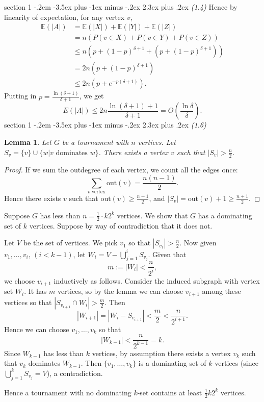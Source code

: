 \documentclass[12pt]{article}
\makeatletter
\theoremstyle{norm}
\newtheorem{lem}[thm]{Lemma}
\newcommand{\E}[0]{\mathbb{E}}
\newcommand{\rc}[1]{\frac{1}{#1}}
\newcommand{\de}[0]{\delta}
\newcommand{\ab}[1]{\left| {#1} \right|}
\newcommand{\pa}[1]{\left( {#1} \right)}
\newcommand{\pf}[2]{\pa{\frac{#1}{#2}}}
\newenvironment{problem}{\@startsection
       {section}
       {1}
       {-.2em}
       {-3.5ex plus -1ex minus -.2ex}
       {2.3ex plus .2ex}
       {\pagebreak[3]%
       \large\bf\noindent{Problem }
       }
       }
       {%
       }
\makeatother
\begin{document}
\begin{problem} {\it (1.4)}
Hence by linearity of expectation, for any vertex $v$,
\begin{align*}
\E(|A|)&=\E(|X|)+\E(|Y|)+\E(|Z|)\\
&=n(P(v\in X)+P(v\in Y)+P(v\in Z))\\
&\leq n(p+(1-p)^{\de+1}+(p+(1-p)^{\de+1}))\\
&=2n(p+(1-p)^{\de+1})\\
&\leq 2n(p+e^{-p(\de+1)}).
\end{align*}
Putting in $p=\frac{\ln(\de+1)}{\de+1}$, we get
\[E(|A|)\leq 2n\frac{\ln(\de+1)+1}{\de+1}=O\pf{\ln \de}{\de}.\]
\end{problem}
\begin{problem} {\it (1.6)}
\begin{lem}
Let $G$ be a tournament with $n$ vertices. Let $S_v=\{v\}\cup \{w|v\text{ dominates }w\}$. 
There exists a vertex $v$ such that $|S_v|> \frac{n}{2}$.
\end{lem}
\begin{proof}
If we sum the outdegree of each vertex, we count all the edges once:
\[
\sum_{v\text{ vertex}}\text{out}(v)=\frac{n(n-1)}{2}.
\]
Hence there exists $v$ such that $\text{out}(v)\geq \frac{n-1}{2}$, and $|S_v|=\text{out}(v)+1\geq \frac{n+1}{2}$.
\end{proof}
Suppose $G$ has less than $n=\rc 2\cdot k2^k$ vertices. We show that $G$ has a dominating set of $k$ vertices. Suppose by way of contradiction that it does not.

Let $V$ be the set of vertices. We pick $v_1$ so that $|S_{v_1}|>\frac{n}{2}$. Now given $v_1,\ldots, v_i,\,(i<k-1)$, let $W_i=V-\bigcup_{j=1}^i S_{v_j}$. Given that
\[
m:=|W_i|< \frac{n}{2^i},
\]
we choose $v_{i+1}$ inductively as follows. Consider the induced subgraph with vertex set $W_i$. It has $m$ vertices, so by the lemma we can choose $v_{i+1}$ among these vertices so that $|S_{v_{i+1}}\cap W_i|>\frac{m}{2}$. Then
\[
|W_{i+1}|=|W_i-S_{v_{i+1}}|<\frac{m}{2}< \frac{n}{2^{i+1}}.
\]
Hence we can choose $v_1,\ldots, v_k$ so that
\[
|W_{k-1}|< \frac{n}{2^{k-1}}=k.
\]
Since $W_{k-1}$ has less than $k$ vertices, by assumption there exists a vertex $v_k$ such that $v_k$ dominates $W_{k-1}$. Then $\{v_1,\ldots, v_k\}$ is a dominating set of $k$ vertices (since $\bigcup_{j=1}^k S_{v_j}=V$), a contradiction.

Hence a tournament with no dominating $k$-set contains at least $\rc{2}k2^k$ vertices.
\end{problem}
\end{document}
